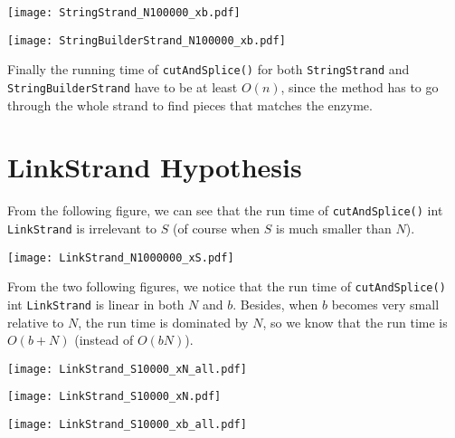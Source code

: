 \documentclass[11pt]{article}
\begin{document}
\centerline{\texttt{[image: StringStrand\_N100000\_xb.pdf]}}

\centerline{\texttt{[image: StringBuilderStrand\_N100000\_xb.pdf]}}

Finally the running time of \texttt{cutAndSplice()} for both \texttt{StringStrand} and \texttt{StringBuilderStrand} have to be at least $O(n)$, since the method has to go through the whole strand to find pieces that matches the enzyme.

\section{LinkStrand Hypothesis}

From the following figure, we can see that the run time of \texttt{cutAndSplice()} int \texttt{LinkStrand} is irrelevant to $S$ (of course when $S$ is much smaller than $N$).

\centerline{\texttt{[image: LinkStrand\_N1000000\_xS.pdf]}}

From the two following figures, we notice that the run time of \texttt{cutAndSplice()} int \texttt{LinkStrand} is linear in both $N$ and $b$. Besides, when $b$ becomes very small relative to $N$, the run time is dominated by $N$, so we know that the run time is $O(b+N)$ (instead of $O(bN)$).

\centerline{\texttt{[image: LinkStrand\_S10000\_xN\_all.pdf]}}

\centerline{\texttt{[image: LinkStrand\_S10000\_xN.pdf]}}

\centerline{\texttt{[image: LinkStrand\_S10000\_xb\_all.pdf]}}
\end{document}
